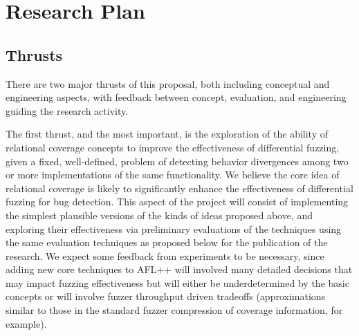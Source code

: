 \section{Research Plan}

\subsection{Thrusts}

There are two major thrusts of this proposal, both including
conceptual and engineering aspects, with feedback between concept,
evaluation, and engineering guiding the research activity.

The first thrust, and the most important, is the exploration of the
ability of relational coverage concepts to improve the effectiveness
of differential fuzzing, given a fixed, well-defined, problem of
detecting behavior divergences among two or more implementations of
the same functionality.  We believe the core idea of relational
coverage is likely to significantly enhance the effectiveness of
differential fuzzing for bug detection.  This aspect of the project
will consist of implementing the simplest plausible versions of the
kinds of ideas proposed above, and exploring their effectiveness via
preliminary evaluations of the techniques using the same evaluation
techniques as proposed below for the publication of the research.  We
expect some feedback from experiments to be necessary, since adding
new core techniques to AFL++ will involved many detailed decisions
that may impact fuzzing effectiveness but will either be
underdetermined by the basic concepts or will involve fuzzer
throughput driven tradeoffs (approximations similar to those in the
standard fuzzer compression of coverage information, for example).

